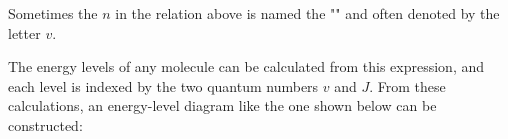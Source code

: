 	Sometimes the $n$ in the relation above is named the "" and often denoted by the letter $v$.
	
	The energy levels of any molecule can be calculated from this expression, and each
level is indexed by the two quantum numbers $v$ and $J$. From these calculations, an
energy-level diagram like the one shown below can be constructed:
	\begin{figure}[H]
		\centering
		  
		
		\begin{tikzpicture}[x=0.75pt,y=0.75pt,yscale=-1,xscale=1]
		

\end{tikzpicture}
\end{figure}
